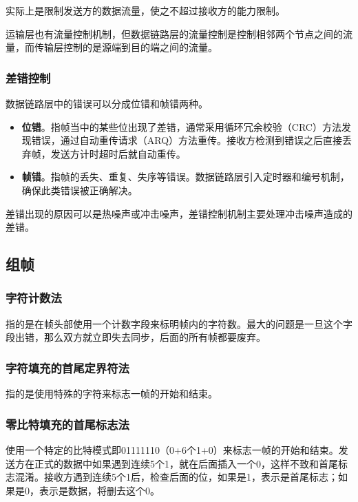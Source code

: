 \documentclass[12pt, a4paper, oneside]{ctexart}
\begin{document}
实际上是限制发送方的数据流量，使之不超过接收方的能力限制。

运输层也有流量控制机制，但数据链路层的流量控制是控制相邻两个节点之间的流量，而传输层控制的是源端到目的端之间的流量。

\subsubsection{差错控制}

数据链路层中的错误可以分成位错和帧错两种。
\begin{itemize}
    \item {\bf 位错}。指帧当中的某些位出现了差错，通常采用循环冗余校验（CRC）方法发现错误，通过自动重传请求（ARQ）方法重传。接收方检测到错误之后直接丢弃帧，发送方计时超时后就自动重传。
    \item {\bf 帧错}。指帧的丢失、重复、失序等错误。数据链路层引入定时器和编号机制，确保此类错误被正确解决。
\end{itemize}

差错出现的原因可以是热噪声或冲击噪声，差错控制机制主要处理冲击噪声造成的差错。

\subsection{组帧}

\subsubsection{字符计数法}

指的是在帧头部使用一个计数字段来标明帧内的字符数。最大的问题是一旦这个字段出错，那么双方就立即失去同步，后面的所有帧都要废弃。

\subsubsection{字符填充的首尾定界符法}

指的是使用特殊的字符来标志一帧的开始和结束。

\subsubsection{零比特填充的首尾标志法}

使用一个特定的比特模式即01111110（0+6个1+0）来标志一帧的开始和结束。发送方在正式的数据中如果遇到连续5个1，就在后面插入一个0，这样不致和首尾标志混淆。接收方遇到连续5个1后，检查后面的位，如果是1，表示是首尾标志；如果是0，表示是数据，将删去这个0。
\end{document}
